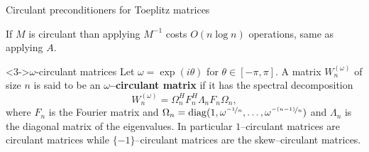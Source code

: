 \documentclass[aspectratio=169,xcolor=dvipsnames]{beamer}
\begin{document}
\begin{frame}{Circulant preconditioners for Toeplitz matrices}

\textcolor{yellow}{\faLightbulb} If $M$ is \alert{circulant} than applying $M^{-1}$ costs $O(n \log n)$ operations, same as applying $A$.


\begin{block}<3->{$\omega$-circulant matrices}
Let $\omega = \exp(i\theta)$ for $\theta \in [-\pi,\pi]$. A matrix
$W_n^{(\omega)}$ of size $n$ is said to be an \textbf{$\omega$--circulant
	matrix} if it has the spectral
decomposition \begin{equation*}
	W_n^{(\omega)} = \Omega_n^H F_n^H \Lambda_n F_n \Omega_n,
\end{equation*}
where $F_n$ is the Fourier matrix and $\Omega_n =
\operatorname{diag}(1,\omega^{\nicefrac{-1}{n}},\ldots,\omega^{\nicefrac{-(n-1)}{n}})$
and $\Lambda_n$ is the diagonal matrix of the eigenvalues. In
particular $1$--circulant matrices are circulant matrices while
$\{-1\}$--circulant matrices are the skew--circulant matrices.
\end{block}


\end{frame}
\end{document}
